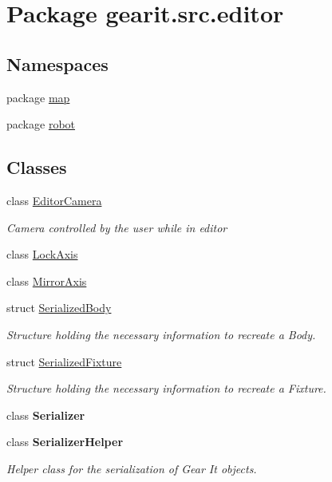 \hypertarget{namespacegearit_1_1src_1_1editor}{\section{Package gearit.\+src.\+editor}
\label{namespacegearit_1_1src_1_1editor}
}
\subsection*{Namespaces}
\begin{DoxyCompactItemize}
\item 
package \hyperlink{namespacegearit_1_1src_1_1editor_1_1map}{map}
\item 
package \hyperlink{namespacegearit_1_1src_1_1editor_1_1robot}{robot}
\end{DoxyCompactItemize}
\subsection*{Classes}
\begin{DoxyCompactItemize}
\item 
class \hyperlink{classgearit_1_1src_1_1editor_1_1_editor_camera}{Editor\+Camera}
\begin{DoxyCompactList}\small\item\em Camera controlled by the user while in editor \end{DoxyCompactList}\item 
class \hyperlink{classgearit_1_1src_1_1editor_1_1_lock_axis}{Lock\+Axis}
\item 
class \hyperlink{classgearit_1_1src_1_1editor_1_1_mirror_axis}{Mirror\+Axis}
\item 
struct \hyperlink{structgearit_1_1src_1_1editor_1_1_serialized_body}{Serialized\+Body}
\begin{DoxyCompactList}\small\item\em Structure holding the necessary information to recreate a Body. \end{DoxyCompactList}\item 
struct \hyperlink{structgearit_1_1src_1_1editor_1_1_serialized_fixture}{Serialized\+Fixture}
\begin{DoxyCompactList}\small\item\em Structure holding the necessary information to recreate a Fixture. \end{DoxyCompactList}\item 
class {\bfseries Serializer}
\item 
class {\bfseries Serializer\+Helper}
\begin{DoxyCompactList}\small\item\em Helper class for the serialization of Gear It objects. \end{DoxyCompactList}\end{DoxyCompactItemize}

